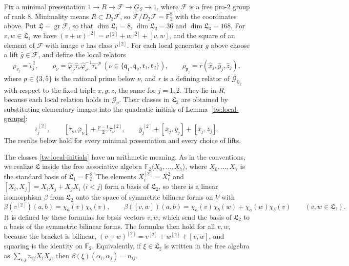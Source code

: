 \documentclass[11pt]{amsart}
\numberwithin{equation}{section}
\theoremstyle{definition}
\theoremstyle{remark}
\newcommand{\Ftwo}{\mathbb F_2}
\newcommand{\Q}{\mathbb Q}
\begin{document}
Fix a minimal presentation $1\to R\to\mathcal F\to G_S\to1$, where
$\mathcal F$ is a free pro-$2$ group of rank $8$. Minimality means
$R\subset D_2\mathcal F$, so $\mathcal F/D_2\mathcal F=\Ftwo^8$ with the
coordinates above. Put $\mathfrak L=\operatorname{gr}\mathcal F$, so that
$\dim\mathfrak L_1=8$, $\dim\mathfrak L_2=36$ and $\dim\mathfrak L_3=168$.
For $v,w\in\mathfrak L_1$ we have $(v+w)^{[2]}=v^{[2]}+w^{[2]}+[v,w]$, and the
square of an element of $\mathcal F$ with image $v$ has class $v^{[2]}$. For
each local generator $g$ above choose a lift $\hat g\in\mathcal F$, and define
the local relators
\begin{equation}\label{tw:relators}
 \rho_{v_j}=\hat\iota_j^{\,2},\qquad
 \rho_\nu=\hat\varphi_\nu\hat\tau_\nu\hat\varphi_\nu^{-1}\hat\tau_\nu^{-p}
 \ (\nu\in\{\mathfrak q_1,\mathfrak q_2,\mathfrak r_1,\mathfrak r_2\}),\qquad
 \rho_{\mathfrak p_j}=r(\hat x_j,\hat y_j,\hat z_j),
\end{equation}
where $p\in\{3,5\}$ is the rational prime below $\nu$, and $r$ is a
defining relator of $\mathcal G_{\Q_2}$ with respect to the fixed triple
$x,y,z$, the same for $j=1,2$. They lie in $R$, because each local relation
holds in $\mathcal G_\nu$. Their classes in $\mathfrak L_2$ are obtained by
substituting elementary images into the quadratic initials of
Lemma~\ref{tw:local-groups}:
\begin{equation}\label{tw:local-initials}
 \bar\iota_j^{\,[2]},\qquad
 [\bar\tau_\nu,\bar\varphi_\nu]+\tfrac{p-1}2\bar\tau_\nu^{\,[2]},\qquad
 \bar y_j^{\,[2]}+[\bar x_j,\bar y_j]+[\bar x_j,\bar z_j].
\end{equation}
The results below hold for every minimal presentation and every choice of
lifts.

The classes \eqref{tw:local-initials} have an arithmetic meaning. As in the
conventions, we realize $\mathfrak L$ inside the free associative algebra
$\Ftwo\langle X_0,\dots,X_7\rangle$, where $X_0,\dots,X_7$ is the standard
basis of $\mathfrak L_1=\Ftwo^8$. The
elements $X_i^{[2]}=X_i^2$ and $[X_i,X_j]=X_iX_j+X_jX_i$ ($i<j$) form a
basis of $\mathfrak L_2$, so there is a linear isomorphism $\beta$ from
$\mathfrak L_2$ onto the space of symmetric bilinear forms on $V$ with
\[
 \beta(v^{[2]})(a,b)=\chi_a(v)\chi_b(v),\qquad
 \beta([v,w])(a,b)=\chi_a(v)\chi_b(w)+\chi_a(w)\chi_b(v)
 \qquad(v,w\in\mathfrak L_1).
\]
It is defined by these formulas for basis vectors $v,w$, which send the basis
of $\mathfrak L_2$ to a basis of the symmetric bilinear forms. The formulas
then hold for all $v,w$, because the bracket is bilinear,
$(v+w)^{[2]}=v^{[2]}+w^{[2]}+[v,w]$, and squaring is the identity on $\Ftwo$.
Equivalently, if $\xi\in\mathfrak L_2$ is written in the free algebra as
$\sum_{i,j}n_{ij}X_iX_j$, then $\beta(\xi)(\alpha_i,\alpha_j)=n_{ij}$.
\end{document}

